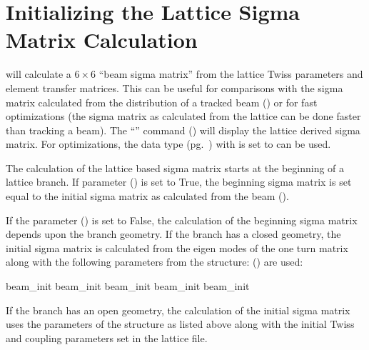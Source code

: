 {{{{{{{{{{{\begin{description}
{{{{{{{{After initialization, the  () command can be used to set
 and . Note: Deprecated names for  and
 are  and  respectively.
\end{description}

\section{Initializing the Lattice Sigma Matrix Calculation}
\label{s:lat.sig.init}

\tao will calculate a $6\times6$ ``beam sigma matrix'' from the lattice Twiss parameters and element
transfer matrices. This can be useful for comparisons with the sigma matrix calculated from the
distribution of a tracked beam () or for fast optimizations (the sigma matrix as
calculated from the lattice can be done faster than tracking a beam). The ``'' command () will display the lattice derived sigma matrix. For
optimizations, the  data type (pg.~) with  is set to 
can be used.

The calculation of the lattice based sigma matrix starts at the beginning of a lattice branch. If
 parameter  () is set to True, the
beginning sigma matrix is set equal to the initial sigma matrix as calculated from the beam
().

If the  parameter  () is set to
False, the calculation of the beginning sigma matrix depends upon the branch geometry.  If the
branch has a closed geometry, the initial sigma matrix is calculated from the eigen modes of the one
turn matrix along with the following parameters from the  structure:
() are used:
\begin{example}
  beam_init%
  beam_init%
  beam_init%
  beam_init%
  beam_init%
\end{example}
If the branch has an open geometry, the calculation of the initial sigma matrix uses the parameters
of the  structure as listed above along with the initial Twiss and coupling parameters
set in the lattice file.

}}}}}}}}}}}

